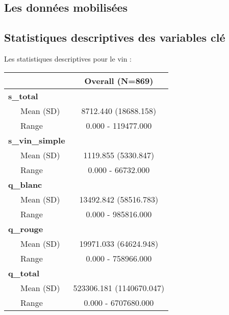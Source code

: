 \documentclass[11pt, a4paper]{article}
\begin{document}
\subsection*{Les données mobilisées}


\subsection*{Statistiques descriptives des variables clé}
Les statistiques descriptives pour le vin :
\begin{center}
    \begin{tabular}{l|c}
\hline
 & Overall (N=869)\\
\hline
\textbf{s_total} & \\
\hline
~~~Mean (SD) & 8712.440 (18688.158)\\
\hline
~~~Range & 0.000 - 119477.000\\
\hline
\textbf{s_vin_simple} & \\
\hline
~~~Mean (SD) & 1119.855 (5330.847)\\
\hline
~~~Range & 0.000 - 66732.000\\
\hline
\textbf{q_blanc} & \\
\hline
~~~Mean (SD) & 13492.842 (58516.783)\\
\hline
~~~Range & 0.000 - 985816.000\\
\hline
\textbf{q_rouge} & \\
\hline
~~~Mean (SD) & 19971.033 (64624.948)\\
\hline
~~~Range & 0.000 - 758966.000\\
\hline
\textbf{q_total} & \\
\hline
~~~Mean (SD) & 523306.181 (1140670.047)\\
\hline
~~~Range & 0.000 - 6707680.000\\
\hline
\end{tabular}
\end{center}
\end{document}

